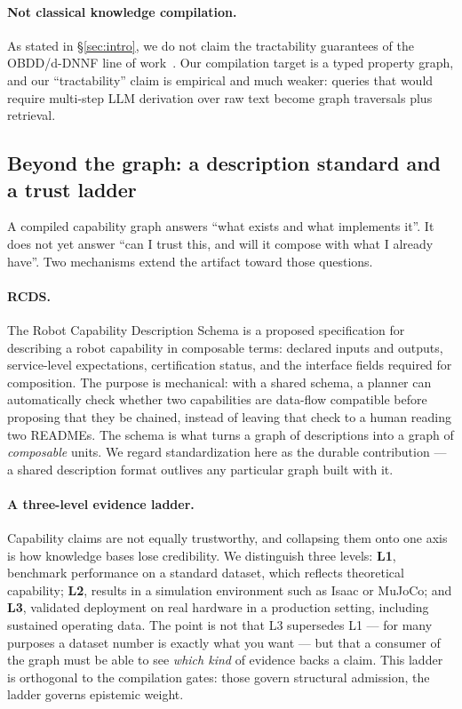 \documentclass[10pt,a4paper]{article}
\begin{document}
\paragraph{Not classical knowledge compilation.} As stated in
\S\ref{sec:intro}, we do not claim the tractability guarantees of the
OBDD/d-DNNF line of work~\cite{darwiche2002kcmap}. Our compilation target is a
typed property graph, and our ``tractability'' claim is empirical and much
weaker: queries that would require multi-step LLM derivation over raw text become
graph traversals plus retrieval.

\subsection{Beyond the graph: a description standard and a trust ladder}
\label{sec:rcds}

A compiled capability graph answers ``what exists and what implements it''. It
does not yet answer ``can I trust this, and will it compose with what I already
have''. Two mechanisms extend the artifact toward those questions.

\paragraph{RCDS.} The Robot Capability Description Schema is a proposed
specification for describing a robot capability in composable terms: declared
inputs and outputs, service-level expectations, certification status, and the
interface fields required for composition. The purpose is mechanical: with a
shared schema, a planner can automatically check whether two capabilities are
data-flow compatible before proposing that they be chained, instead of leaving
that check to a human reading two READMEs. The schema is what turns a graph of
descriptions into a graph of \emph{composable} units. We regard standardization
here as the durable contribution --- a shared description format outlives any
particular graph built with it.

\paragraph{A three-level evidence ladder.} Capability claims are not equally
trustworthy, and collapsing them onto one axis is how knowledge bases lose
credibility. We distinguish three levels: \textbf{L1}, benchmark performance on a
standard dataset, which reflects theoretical capability; \textbf{L2}, results in
a simulation environment such as Isaac or MuJoCo; and \textbf{L3}, validated
deployment on real hardware in a production setting, including sustained
operating data. The point is not that L3 supersedes L1 --- for many purposes a
dataset number is exactly what you want --- but that a consumer of the graph must
be able to see \emph{which kind} of evidence backs a claim. This ladder is
orthogonal to the compilation gates: those govern structural admission, the
ladder governs epistemic weight.
\end{document}
